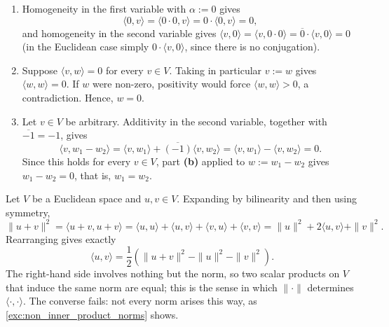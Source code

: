 \begin{exercisesolution}
\label{sol:basic_properties_inner_prod}
  \begin{enumerate}[label=\textbf{(\alph*)}]
    \item Homogeneity in the first variable with $\alpha := 0$ gives
      \[ \langle 0, v \rangle = \langle 0 \cdot 0, v \rangle = 0 \cdot \langle 0, v \rangle = 0, \]
      and homogeneity in the second variable gives $\langle v, 0 \rangle = \langle v, 0 \cdot 0 \rangle = \overline{0} \cdot \langle v, 0 \rangle = 0$ (in the Euclidean case simply $0 \cdot \langle v, 0 \rangle$, since there is no conjugation).
    \item Suppose $\langle v, w \rangle = 0$ for every $v \in V$. Taking in particular $v := w$ gives $\langle w, w \rangle = 0$. If $w$ were non-zero, positivity would force $\langle w, w \rangle > 0$, a contradiction. Hence, $w = 0$.
    \item Let $v \in V$ be arbitrary. Additivity in the second variable, together with $\overline{-1} = -1$, gives
      \[ \langle v, w_1 - w_2 \rangle = \langle v, w_1 \rangle + \overline{(-1)} \langle v, w_2 \rangle = \langle v, w_1 \rangle - \langle v, w_2 \rangle = 0. \]
      Since this holds for every $v \in V$, part \textbf{(b)} applied to $w := w_1 - w_2$ gives $w_1 - w_2 = 0$, that is, $w_1 = w_2$.
  \end{enumerate}
\end{exercisesolution}

\begin{exercisesolution}
\label{sol:polarization_a}
  Let $V$ be a Euclidean space and $u, v \in V$. Expanding by bilinearity and then using symmetry,
  \[ \|u+v\|^2 = \langle u+v, u+v \rangle = \langle u, u \rangle + \langle u, v \rangle + \langle v, u \rangle + \langle v, v \rangle = \|u\|^2 + 2\langle u, v \rangle + \|v\|^2. \]
  Rearranging gives exactly
  \[ \langle u, v \rangle = \frac{1}{2}\left( \|u+v\|^2 - \|u\|^2 - \|v\|^2 \right). \]
  The right-hand side involves nothing but the norm, so two scalar products on $V$ that induce the same norm are equal; this is the sense in which $\| \cdot \|$ determines $\langle \cdot, \cdot \rangle$. The converse fails: not every norm arises this way, as \cref{exc:non_inner_product_norms} shows.
\end{exercisesolution}

